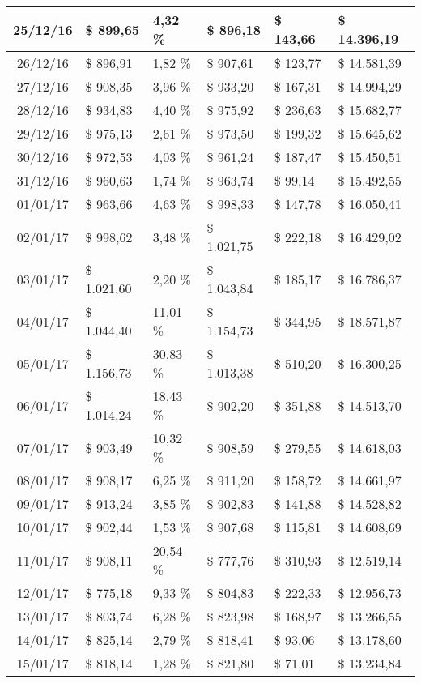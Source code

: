 \begin{small}
\begin{longtable}{|c|l|l|l|l|l|}
25/12/16 & \$ 899,65 & 4,32 \% & \$ 896,18 & \$ 143,66 & \$ 14.396,19 \\ \hline
26/12/16 & \$ 896,91 & 1,82 \% & \$ 907,61 & \$ 123,77 & \$ 14.581,39 \\ \hline
27/12/16 & \$ 908,35 & 3,96 \% & \$ 933,20 & \$ 167,31 & \$ 14.994,29 \\ \hline
28/12/16 & \$ 934,83 & 4,40 \% & \$ 975,92 & \$ 236,63 & \$ 15.682,77 \\ \hline
29/12/16 & \$ 975,13 & 2,61 \% & \$ 973,50 & \$ 199,32 & \$ 15.645,62 \\ \hline
30/12/16 & \$ 972,53 & 4,03 \% & \$ 961,24 & \$ 187,47 & \$ 15.450,51 \\ \hline
31/12/16 & \$ 960,63 & 1,74 \% & \$ 963,74 & \$ 99,14 & \$ 15.492,55 \\ \hline
01/01/17 & \$ 963,66 & 4,63 \% & \$ 998,33 & \$ 147,78 & \$ 16.050,41 \\ \hline
02/01/17 & \$ 998,62 & 3,48 \% & \$ 1.021,75 & \$ 222,18 & \$ 16.429,02 \\ \hline
03/01/17 & \$ 1.021,60 & 2,20 \% & \$ 1.043,84 & \$ 185,17 & \$ 16.786,37 \\ \hline
04/01/17 & \$ 1.044,40 & 11,01 \% & \$ 1.154,73 & \$ 344,95 & \$ 18.571,87 \\ \hline
05/01/17 & \$ 1.156,73 & 30,83 \% & \$ 1.013,38 & \$ 510,20 & \$ 16.300,25 \\ \hline
06/01/17 & \$ 1.014,24 & 18,43 \% & \$ 902,20 & \$ 351,88 & \$ 14.513,70 \\ \hline
07/01/17 & \$ 903,49 & 10,32 \% & \$ 908,59 & \$ 279,55 & \$ 14.618,03 \\ \hline
08/01/17 & \$ 908,17 & 6,25 \% & \$ 911,20 & \$ 158,72 & \$ 14.661,97 \\ \hline
09/01/17 & \$ 913,24 & 3,85 \% & \$ 902,83 & \$ 141,88 & \$ 14.528,82 \\ \hline
10/01/17 & \$ 902,44 & 1,53 \% & \$ 907,68 & \$ 115,81 & \$ 14.608,69 \\ \hline
11/01/17 & \$ 908,11 & 20,54 \% & \$ 777,76 & \$ 310,93 & \$ 12.519,14 \\ \hline
12/01/17 & \$ 775,18 & 9,33 \% & \$ 804,83 & \$ 222,33 & \$ 12.956,73 \\ \hline
13/01/17 & \$ 803,74 & 6,28 \% & \$ 823,98 & \$ 168,97 & \$ 13.266,55 \\ \hline
14/01/17 & \$ 825,14 & 2,79 \% & \$ 818,41 & \$ 93,06 & \$ 13.178,60 \\ \hline
15/01/17 & \$ 818,14 & 1,28 \% & \$ 821,80 & \$ 71,01 & \$ 13.234,84 \\ \hline

\end{longtable}
\end{small}
